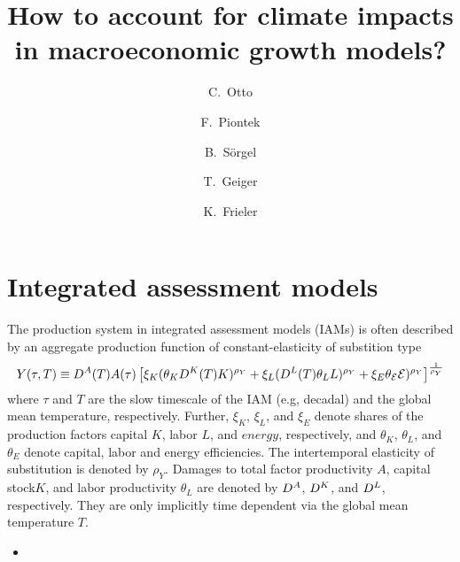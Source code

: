 \documentclass[preprint,3p,authoryear]{elsarticle}
\let\cite\citep
\begin{document}

\begin{frontmatter}

  \title{How to account for climate impacts in macroeconomic growth models?}

\author[PIK]{C.~Otto}


\author[PIK]{F.~Piontek}
\author[PIK]{B.~Sörgel}
\author[PIK]{T.~Geiger}
\author[PIK]{K.~Frieler}


\address[PIK]{Potsdam Institute for Climate Impact Research, Potsdam, Germany}




\end{frontmatter}



\section{Integrated assessment models}
\label{sec:set}
The production system in integrated assessment models (IAMs) is often described by an aggregate production function of constant-elasticity of substition type \cite{BAU17} 
\begin{equation}
  \label{eq:CD}
  Y(\tau,T)\equiv D^A(T)A(\tau)\left[\xi_K(\theta_K D^K(T)K)^{\rho_Y}+\xi_L(D^L(T)\theta_LL)^{\rho_Y}+\xi_E\theta_{\mathcal{E}}\mathcal{E})^{\rho_Y}\right]^{\frac{1}{\rho_Y}}
\end{equation}
where $\tau$ and $T$ are the slow timescale of the IAM (e.g, decadal) and the global mean temperature, respectively. Further, $\xi_K$, $\xi_L$, and $\xi_E$ denote shares of the production factors capital $K$, labor $L$, and $energy$, respectively, and $\theta_K$, $\theta_L$, and $\theta_E$ denote capital, labor and energy efficiencies. The intertemporal elasticity of substitution is denoted by $\rho_Y$. Damages to total factor productivity $A$, capital stock$ K$, and labor productivity $\theta_L$ are denoted by $D^A$, $D^K$, and $D^L$, respectively. They are only implicitly time dependent via the global mean temperature $T$. 
\begin{itemize}
\item {}
\end{itemize}
\end{document}
